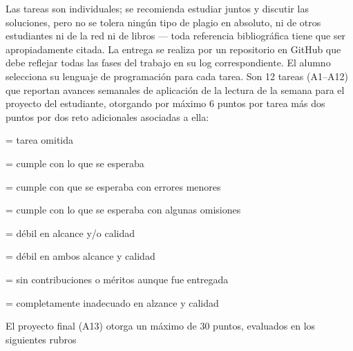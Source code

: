 \documentclass[10 pt]{article}
\begin{document}
  Las tareas son individuales; se recomienda estudiar juntos y
  discutir las soluciones, pero no se tolera ning\'{u}n tipo de plagio
  en absoluto, ni de otros estudiantes ni de la red ni de libros ---
  toda referencia bibliogr\'{a}fica tiene que ser apropiadamente
  citada. La entrega se realiza por un repositorio en GitHub que debe
  reflejar todas las fases del trabajo en su log correspondiente. El
  alumno selecciona su lenguaje de programaci\'{o}n para cada
  tarea. Son 12 tareas (A1--A12) que reportan avances semanales de
  aplicaci\'{o}n de la lectura de la semana para el proyecto del
  estudiante, otorgando por m\'{a}ximo 6 puntos por tarea m\'{a}s dos
  puntos por dos reto adicionales asociadas a ella:
  \begin{description}[itemsep=-2pt]
  \item[NP]{= tarea omitida}
  \item[6]{= cumple con lo que se esperaba}
  \item[5]{= cumple con que se esperaba con errores menores}
  \item[4]{= cumple con lo que se esperaba con algunas omisiones}
  \item[3]{= d\'{e}bil en alcance y/o calidad}
  \item[2]{= d\'{e}bil en ambos alcance y calidad}
  \item[1]{= sin contribuciones o m\'{e}ritos aunque fue entregada}
  \item[0]{= completamente inadecuado en alzance y calidad}
  \end{description}
  El proyecto final (A13) otorga un m\'{a}ximo de 30 puntos, evaluados en los
  siguientes rubros
\end{document}
